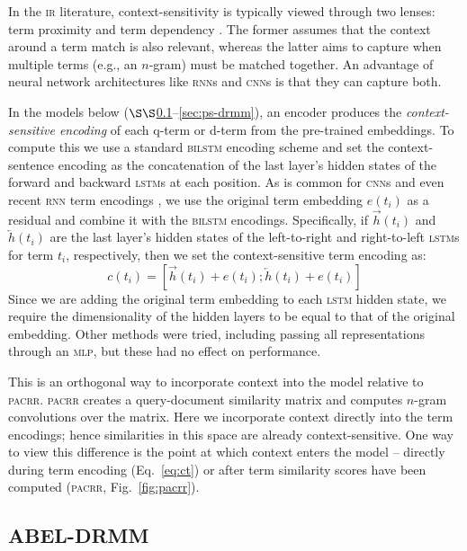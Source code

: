 \documentclass[11pt,a4paper]{article}
\newcommand{\mlp}{\textsc{mlp}\xspace}
\newcommand{\lstm}{\textsc{lstm}\xspace}
\newcommand{\bilstm}{\textsc{bilstm}\xspace}
\newcommand{\rnn}{\textsc{rnn}\xspace}
\newcommand{\cnn}{\textsc{cnn}\xspace}
\newcommand{\ir}{\textsc{ir}\xspace}
\newcommand{\pacrr}{\textsc{pacrr}\xspace}
\begin{document}
In the \ir literature, context-sensitivity is typically viewed through two lenses: term proximity \cite{buttcher2006term} and term dependency \cite{metzler2005markov}. The former assumes that
the context around a term match is also relevant, whereas the latter aims to capture when multiple terms (e.g., an $n$-gram) must be 
matched together. An advantage of neural network architectures like \rnn{s} and \cnn{s} is that they can capture both.

In the models below ($\S\S$\ref{sec:had-drmm}--\ref{sec:ps-drmm}), an encoder produces the \emph{context-sensitive encoding} of each q-term or d-term from the pre-trained embeddings. To compute this we use a standard \bilstm encoding scheme and set the context-sentence encoding as the concatenation of the last layer's hidden states of the forward and backward \lstm{s} at each position. As is common for \cnn{s} and even recent \rnn term encodings \cite{peters2018deep}, we use the original term embedding $e(t_i)$ as a residual and combine it with the \bilstm encodings. Specifically, if $\overrightarrow{h}(t_i)$ and $\overleftarrow{h}(t_i)$ are the last layer's hidden states of the left-to-right and right-to-left \lstm{s} for term $t_i$, respectively, then we set the context-sensitive term encoding as:
\begin{equation}
c(t_i) = [\overrightarrow{h}(t_i) + e(t_i); \overleftarrow{h}(t_i) + e(t_i)]
\label{eq:ct}
\end{equation}
Since we are adding the original term embedding to each \lstm hidden state, we require the dimensionality of the hidden layers to be equal to that of the original embedding. Other methods were tried, including passing all representations through an \mlp, but these had no effect on performance.

This is an orthogonal way to incorporate context into the model relative to \pacrr. 
\pacrr creates a query-document similarity matrix and computes $n$-gram  convolutions over the matrix. Here we incorporate context directly into the term 
encodings; hence similarities in this space are already context-sensitive. One way to view this difference is the point at which context enters the model -- 
directly during term encoding (Eq.~\ref{eq:ct}) or after term similarity scores have been computed (\pacrr, Fig.~\ref{fig:pacrr}).



\subsection{ABEL-DRMM}
\label{sec:had-drmm}
\label{sec:abel-drmm}
\end{document}
